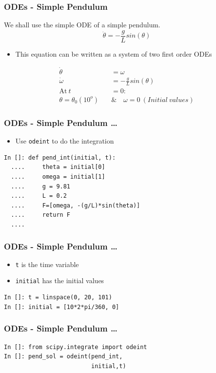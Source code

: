 \begin{frame}[fragile]
\frametitle{ODEs - Simple Pendulum}
We shall use the simple ODE of a simple pendulum. 
\begin{equation*}
\ddot{\theta} = -\frac{g}{L}sin(\theta)
\end{equation*}
\begin{itemize}
\item This equation can be written as a system of two first order ODEs
\end{itemize}
\begin{align}
\dot{\theta} &= \omega \\
\dot{\omega} &= -\frac{g}{L}sin(\theta) \\
 \text{At}\ t &= 0 : \nonumber \\
 \theta = \theta_0(10^o)\quad & \&\quad  \omega = 0\ (Initial\ values)\nonumber 
\end{align}
\end{frame}

\begin{frame}[fragile]
\frametitle{ODEs - Simple Pendulum \ldots}
\begin{itemize}
\item Use \texttt{odeint} to do the integration
\end{itemize}
\begin{lstlisting}
In []: def pend_int(initial, t):
  ....     theta = initial[0]
  ....     omega = initial[1]
  ....     g = 9.81
  ....     L = 0.2
  ....     F=[omega, -(g/L)*sin(theta)]
  ....     return F
  ....
\end{lstlisting}
\end{frame}

\begin{frame}[fragile]
\frametitle{ODEs - Simple Pendulum \ldots}
\begin{itemize}
\item \texttt{t} is the time variable \\ 
\item \texttt{initial} has the initial values
\end{itemize}
\begin{lstlisting}
In []: t = linspace(0, 20, 101)
In []: initial = [10*2*pi/360, 0]
\end{lstlisting} 
\end{frame}

\begin{frame}[fragile]
\frametitle{ODEs - Simple Pendulum \ldots}
\texttt{}
\begin{lstlisting}
In []: from scipy.integrate import odeint
In []: pend_sol = odeint(pend_int, 
                         initial,t)
\end{lstlisting}
\end{frame}

